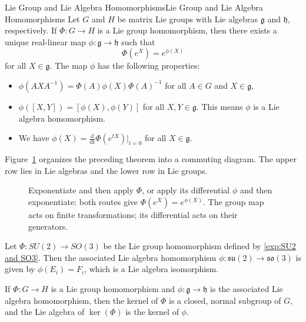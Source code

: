 \documentclass[../main.tex]{subfiles}
\begin{document}
\begin{theorem}{Lie Group and Lie Algebra Homomorphisms}{Lie Group and Lie Algebra Homomorphisms}
  Let $G$ and $H$ be matrix Lie groups with Lie algebras $\mathfrak{g}$ and $\mathfrak{h}$, respectively. If $\Phi:G\to H$ is a Lie group homomorphism, then there exists a unique real-linear map $\phi:\mathfrak{g}\to\mathfrak{h}$ such that
  \begin{equation}
    \Phi(e^{X}) = e^{\phi(X)}
  \end{equation}
  for all $X \in \mathfrak{g}$. The map $\phi$ has the following properties:
  \begin{itemize}
    \item $\phi(A X A^{-1}) = \Phi(A) \phi(X) \Phi(A)^{-1}$ for all $A \in G$ and $X \in \mathfrak{g}$,
    \item $\phi([X,Y]) = [\phi(X),\phi(Y)]$ for all $X,Y \in \mathfrak{g}$. This means $\phi$ is a Lie algebra homomorphism.
    \item We have $\displaystyle \phi(X) = \frac{\mathrm{d}}{\mathrm{d} t} \Phi(e^{tX}) \bigg|_{t=0}$ for all $X \in \mathfrak{g}$.
  \end{itemize}
\end{theorem}


Figure~\ref{fig:homomorphisms-and-exponentials} organizes the preceding theorem into a commuting diagram. The upper row lies in Lie algebras and the lower row in Lie groups.

\begin{figure}[H]
    \centering
    \caption{Exponentiate and then apply $\Phi$, or apply its differential $\phi$ and then exponentiate: both routes give $\Phi(e^X)=e^{\phi(X)}$. The group map acts on finite transformations; its differential acts on their generators.}
    \label{fig:homomorphisms-and-exponentials}
\end{figure}

\begin{example}{}{}
  Let $\Phi: SU(2) \to SO(3)$ be the Lie group homomorphism defined by \ref{exp:SU2 and SO3}. Then the associated Lie algebra homomorphism $\phi: \mathfrak{su}(2) \to \mathfrak{so}(3)$ is given by $\phi(E_i) = F_i$, which is a Lie algebra isomorphism.
\end{example}

\begin{proposition}{}{}
  If $\Phi: G \to H$ is a Lie group homomorphism and $\phi: \mathfrak{g} \to \mathfrak{h}$ is the associated Lie algebra homomorphism, then the kernel of $\Phi$ is a closed, normal subgroup of $G$, and the Lie algebra of $\ker(\Phi)$ is the kernel of $\phi$.
\end{proposition}
\end{document}
